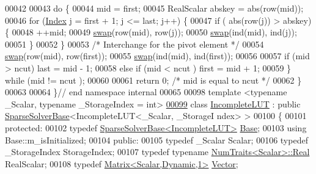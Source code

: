 \begin{DoxyCode}
00042   
00043   \textcolor{keywordflow}{do} \{
00044     mid = first; 
00045     RealScalar abskey = abs(row(mid)); 
00046     \textcolor{keywordflow}{for} (\hyperlink{namespace_eigen_a62e77e0933482dafde8fe197d9a2cfde}{Index} j = first + 1; j <= last; j++) \{
00047       \textcolor{keywordflow}{if} ( abs(row(j)) > abskey) \{
00048         ++mid;
00049         \hyperlink{endian_8c_a3ca5ecd34b04d6a243c054ac3a57f68d}{swap}(row(mid), row(j));
00050         \hyperlink{endian_8c_a3ca5ecd34b04d6a243c054ac3a57f68d}{swap}(ind(mid), ind(j));
00051       \}
00052     \}
00053     \textcolor{comment}{/* Interchange for the pivot element */}
00054     \hyperlink{endian_8c_a3ca5ecd34b04d6a243c054ac3a57f68d}{swap}(row(mid), row(first));
00055     \hyperlink{endian_8c_a3ca5ecd34b04d6a243c054ac3a57f68d}{swap}(ind(mid), ind(first));
00056     
00057     \textcolor{keywordflow}{if} (mid > ncut) last = mid - 1;
00058     \textcolor{keywordflow}{else} \textcolor{keywordflow}{if} (mid < ncut ) first = mid + 1; 
00059   \} \textcolor{keywordflow}{while} (mid != ncut );
00060   
00061   \textcolor{keywordflow}{return} 0; \textcolor{comment}{/* mid is equal to ncut */} 
00062 \}
00063 
00064 \}\textcolor{comment}{// end namespace internal}
00065 
00098 \textcolor{keyword}{template} <\textcolor{keyword}{typename} \_Scalar, \textcolor{keyword}{typename} \_StorageIndex = \textcolor{keywordtype}{int}>
\hyperlink{group___iterative_linear_solvers___module}{00099} \textcolor{keyword}{class }\hyperlink{group___iterative_linear_solvers___module_class_eigen_1_1_incomplete_l_u_t}{IncompleteLUT} : \textcolor{keyword}{public} \hyperlink{group___sparse_core___module_class_eigen_1_1_sparse_solver_base}{SparseSolverBase}<IncompleteLUT<\_Scalar, \_StorageI
      ndex> >
00100 \{
00101   \textcolor{keyword}{protected}:
00102     \textcolor{keyword}{typedef} \hyperlink{group___sparse_core___module_class_eigen_1_1_sparse_solver_base}{SparseSolverBase<IncompleteLUT>} \hyperlink{group___sparse_core___module_class_eigen_1_1_sparse_solver_base}{Base};
00103     \textcolor{keyword}{using} Base::m\_isInitialized;
00104   \textcolor{keyword}{public}:
00105     \textcolor{keyword}{typedef} \_Scalar Scalar;
00106     \textcolor{keyword}{typedef} \_StorageIndex StorageIndex;
00107     \textcolor{keyword}{typedef} \textcolor{keyword}{typename} \hyperlink{group___core___module_struct_eigen_1_1_num_traits}{NumTraits<Scalar>::Real} RealScalar;
00108     \textcolor{keyword}{typedef} \hyperlink{group___core___module}{Matrix<Scalar,Dynamic,1>} \hyperlink{group___core___module}{Vector};

\end{DoxyCode}
